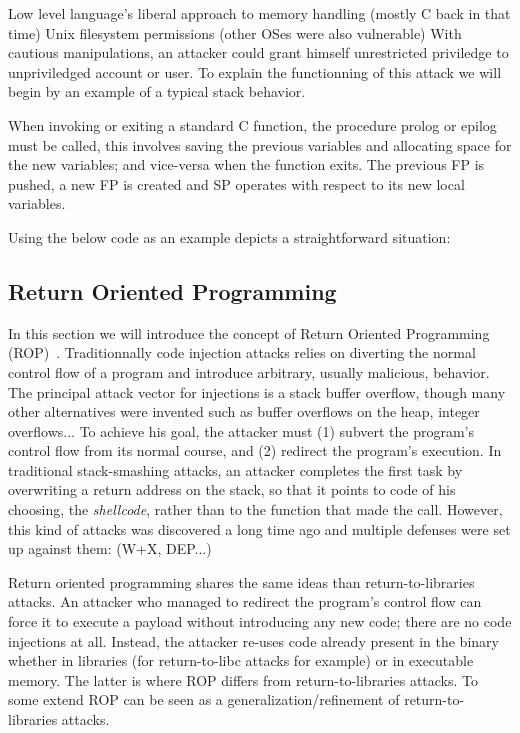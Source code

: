 \documentclass[10pt,twocolumn]{article}
\begin{document}
Low level language's liberal approach to memory handling (mostly C back in that
time) Unix filesystem permissions (other OSes were also vulnerable) With
cautious manipulations, an attacker could grant himself unrestricted priviledge
to unpriviledged account or user. To explain the functionning of this attack we
will begin by an example of a typical stack behavior.

When invoking or exiting a standard C function, the procedure prolog or epilog
must be called, this involves saving the previous variables and allocating
space for the new variables; and vice-versa when the function exits. The
previous FP is pushed, a new FP is created and SP operates with respect to its
new local variables.

Using the below code as an example depicts a straightforward
situation:

\subsection{Return Oriented Programming}
In this section we will introduce the concept of Return Oriented Programming
(ROP)~\cite{roemer_return-oriented_2012}. Traditionnally code injection attacks
relies on diverting the normal control flow of a program and introduce
arbitrary, usually malicious, behavior. The principal attack vector for
injections is a stack buffer overflow, though many other alternatives were
invented such as buffer overflows on the heap, integer overflows... To achieve
his goal, the attacker must (1) subvert the program's control flow from its
normal course, and (2) redirect the program's execution. In traditional
stack-smashing attacks, an attacker completes the first task by overwriting a
return address on the stack, so that it points to code of his choosing, the
\textit{shellcode}, rather than to the function that made the call. However,
this kind of attacks was discovered a long time ago and multiple defenses were
set up against them: (W+X, DEP...)

Return oriented programming shares the same ideas than return-to-libraries
attacks. An attacker who managed to redirect the program's control flow can
force it to execute a payload without introducing any new code; there are no
code injections at all. Instead, the attacker re-uses code already present in
the binary whether in libraries (for return-to-libc attacks for example) or in
executable memory. The latter is where ROP differs from return-to-libraries
attacks. To some extend ROP can be seen as a generalization/refinement of
return-to-libraries attacks.
\end{document}
